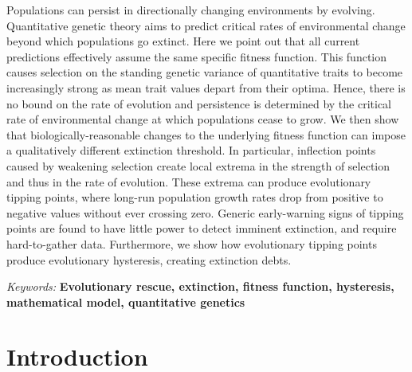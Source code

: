 \documentclass[12pt,letterpaper]{article} %
\begin{document}
Populations can persist in directionally changing environments by evolving. Quantitative genetic theory aims to predict critical rates of environmental change beyond which populations go extinct. Here we point out that all current predictions effectively assume the same specific fitness function. This function causes selection on the standing genetic variance of quantitative traits to become increasingly strong as mean trait values depart from their optima. Hence, there is no bound on the rate of evolution and persistence is determined by the critical rate of environmental change at which populations cease to grow. We then show that biologically-reasonable changes to the underlying fitness function can impose a qualitatively different extinction threshold. In particular, inflection points caused by weakening selection create local extrema in the strength of selection and thus in the rate of evolution. These extrema can produce evolutionary tipping points, where long-run population growth rates drop from positive to negative values without ever crossing zero. Generic early-warning signs of tipping points are found to have little power to detect imminent extinction, and require hard-to-gather data. Furthermore, we show how evolutionary tipping points produce evolutionary hysteresis, creating extinction debts. %

\noindent \textit{Keywords:} \textbf{Evolutionary rescue, extinction, fitness function, hysteresis, mathematical model, quantitative genetics}

\newpage
\section*{Introduction}

\end{document}
